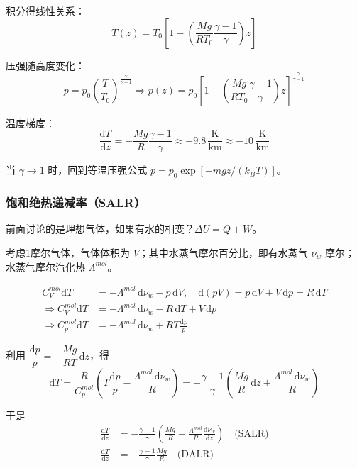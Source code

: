 \documentclass[UTF8]{ctexart}
\theoremstyle{definition}
\begin{document}
积分得线性关系：
\begin{equation}
T(z) = T_0\left[1-\left(\frac{Mg}{RT_0}\frac{\gamma-1}{\gamma}\right)z\right]
\end{equation}

压强随高度变化：
\begin{equation}
p = p_0\left(\frac{T}{T_0}\right)^{\frac{\gamma}{\gamma-1}} \Rightarrow p(z) = p_0\left[1-\left(\frac{Mg}{RT_0}\frac{\gamma-1}{\gamma}\right)z\right]^{\frac{\gamma}{\gamma-1}}
\end{equation}

温度梯度：
\begin{equation}
\frac{\mathrm{d}T}{\mathrm{d}z} = -\frac{Mg}{R}\frac{\gamma-1}{\gamma} \approx -9.8\,\frac{\mathrm{K}}{\mathrm{km}} \approx -10\,\frac{\mathrm{K}}{\mathrm{km}}
\end{equation}

当 $\gamma\to 1$ 时，回到等温压强公式 $p=p_0\exp[-mgz/(k_BT)]$。

\subsubsection*{饱和绝热递减率（SALR）}

前面讨论的是理想气体，如果有水的相变？$\Delta U = Q + W$。

考虑1摩尔气体，气体体积为 $V$；其中水蒸气摩尔百分比，即有水蒸气 $\nu_w$ 摩尔；水蒸气摩尔汽化热 $\Lambda^{mol}$。

\begin{align}
C_V^{mol}\mathrm{d}T &= -\Lambda^{mol}\,\mathrm{d}\nu_w - p\,\mathrm{d}V,\quad \mathrm{d}(pV)=p\,\mathrm{d}V+V\,\mathrm{d}p=R\,\mathrm{d}T \\
\Rightarrow C_V^{mol}\mathrm{d}T &= -\Lambda^{mol}\,\mathrm{d}\nu_w - R\,\mathrm{d}T + V\,\mathrm{d}p \\
\Rightarrow C_p^{mol}\mathrm{d}T &= -\Lambda^{mol}\,\mathrm{d}\nu_w + RT\frac{\mathrm{d}p}{p}
\end{align}

利用 $\dfrac{\mathrm{d}p}{p}=-\dfrac{Mg}{RT}\,\mathrm{d}z$，得
\begin{equation}
\mathrm{d}T = \frac{R}{C_p^{mol}}\left(T\frac{\mathrm{d}p}{p}-\frac{\Lambda^{mol}\,\mathrm{d}\nu_w}{R}\right) = -\frac{\gamma-1}{\gamma}\left(\frac{Mg}{R}\,\mathrm{d}z + \frac{\Lambda^{mol}\,\mathrm{d}\nu_w}{R}\right)
\end{equation}

于是
\begin{align}
\frac{\mathrm{d}T}{\mathrm{d}z} &= \boxed{-\frac{\gamma-1}{\gamma}\left(\frac{Mg}{R}+\frac{\Lambda^{mol}}{R}\frac{\mathrm{d}\nu_w}{\mathrm{d}z}\right)} \quad \text{(SALR)} \\[6pt]
\frac{\mathrm{d}T}{\mathrm{d}z} &= \boxed{-\frac{\gamma-1}{\gamma}\frac{Mg}{R}} \quad \text{(DALR)}
\end{align}
\end{document}
